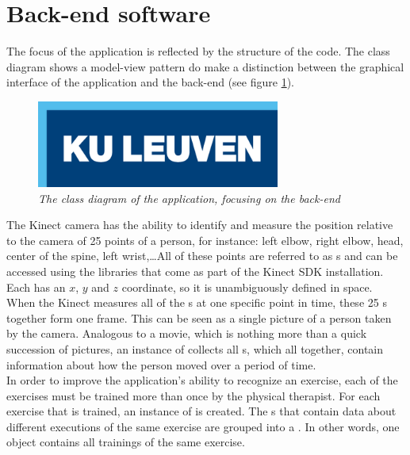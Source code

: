 \section{Back-end software}
\label{section: Back-end software}

The focus of the application is reflected by the structure of the code. The class diagram shows a model-view pattern do make a distinction between the graphical interface of the application and the back-end (see figure \ref{fig: backend_classdiagram}).\\

\begin{figure}[H]
\begin{center}
\includegraphics[width=8cm]{KUL.png}
\caption{\emph{The class diagram of the application, focusing on the back-end}}
\label{fig: backend_classdiagram}
\end{center}
\end{figure}

The Kinect camera has the ability to identify and measure the position relative to the camera of 25 points of a person, for instance: left elbow, right elbow, head, center of the spine, left wrist,\ldots All of these points are referred to as s and can be accessed using the libraries that come as part of the Kinect SDK installation. Each  has an $x$, $y$ and $z$ coordinate, so it is unambiguously defined in space.\\

When the Kinect measures all of the s at one specific point in time, these 25 s together form one frame. This can be seen as a single picture of a person taken by the camera. Analogous to a movie, which is nothing more than a quick succession of pictures, an instance of  collects all s, which all together, contain information about how the person moved over a period of time.\\

In order to improve the application's ability to recognize an exercise, each of the exercises must be trained more than once by the physical therapist. For each exercise that is trained, an instance of  is created. The s that contain data about different executions of the same exercise are grouped into a . In other words, one  object contains all trainings of the same exercise.\\

